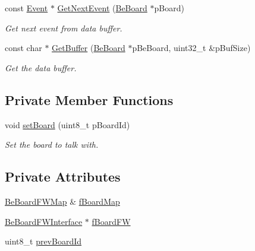 \begin{DoxyCompactItemize}
const \hyperlink{class_ph2___hw_interface_1_1_event}{Event} $\ast$ \hyperlink{class_ph2___hw_interface_1_1_be_board_interface_a8dadf0d6aba310d1476b5c50aae98742}{Get\-Next\-Event} (\hyperlink{class_ph2___hw_description_1_1_be_board}{Be\-Board} $\ast$p\-Board)
\begin{DoxyCompactList}\small\item\em Get next event from data buffer. \end{DoxyCompactList}\item 
const char $\ast$ \hyperlink{class_ph2___hw_interface_1_1_be_board_interface_a09475ae1eaaf7a7ca50c5b426c93152f}{Get\-Buffer} (\hyperlink{class_ph2___hw_description_1_1_be_board}{Be\-Board} $\ast$p\-Be\-Board, uint32\-\_\-t \&p\-Buf\-Size)
\begin{DoxyCompactList}\small\item\em Get the data buffer. \end{DoxyCompactList}\end{DoxyCompactItemize}
\subsection*{Private Member Functions}
\begin{DoxyCompactItemize}
\item 
void \hyperlink{class_ph2___hw_interface_1_1_be_board_interface_ac4f6fae0f69208acc832437359993665}{set\-Board} (uint8\-\_\-t p\-Board\-Id)
\begin{DoxyCompactList}\small\item\em Set the board to talk with. \end{DoxyCompactList}\end{DoxyCompactItemize}
\subsection*{Private Attributes}
\begin{DoxyCompactItemize}
\item 
\hyperlink{namespace_ph2___hw_interface_ac35d341eb47fa7cbe4d28ccbc6ab4875}{Be\-Board\-F\-W\-Map} \& \hyperlink{class_ph2___hw_interface_1_1_be_board_interface_aff153bb1272b1f145c919a9ba2cc572d}{f\-Board\-Map}
\item 
\hyperlink{class_ph2___hw_interface_1_1_be_board_f_w_interface}{Be\-Board\-F\-W\-Interface} $\ast$ \hyperlink{class_ph2___hw_interface_1_1_be_board_interface_a763c8be5545618fb5ca0dfe01667f9ae}{f\-Board\-F\-W}
\item 
uint8\-\_\-t \hyperlink{class_ph2___hw_interface_1_1_be_board_interface_af248fa0474f163d72349854f12d3ad61}{prev\-Board\-Id}
\end{DoxyCompactItemize}


